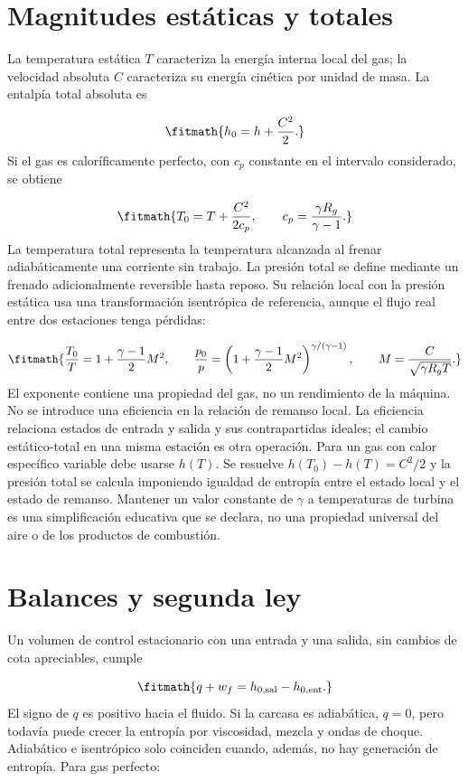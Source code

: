 \documentclass[10pt,openany]{book}
\begin{document}
\section{Magnitudes estáticas y totales}

La temperatura estática \(T\) caracteriza la energía interna local del gas; la velocidad absoluta \(C\) caracteriza su energía cinética por unidad de masa. La entalpía total absoluta es

\[
\fitmath{h_0=h+\frac{C^2}{2}.}
\]
Si el gas es caloríficamente perfecto, con \(c_p\) constante en el intervalo considerado, se obtiene

\[
\fitmath{T_0=T+\frac{C^2}{2c_p},\qquad c_p=\frac{\gamma R_g}{\gamma-1}.}
\]
La temperatura total representa la temperatura alcanzada al frenar adiabáticamente una corriente sin trabajo. La presión total se define mediante un frenado adicionalmente reversible hasta reposo. Su relación local con la presión estática usa una transformación isentrópica de referencia, aunque el flujo real entre dos estaciones tenga pérdidas:

\[
\fitmath{\frac{T_0}{T}=1+\frac{\gamma-1}{2}M^2,\qquad
\frac{p_0}{p}=\left(1+\frac{\gamma-1}{2}M^2\right)^{\gamma/(\gamma-1)},\qquad M=\frac{C}{\sqrt{\gamma R_g T}}.}
\]
El exponente contiene una propiedad del gas, no un rendimiento de la máquina. No se introduce una eficiencia en la relación de remanso local. La eficiencia relaciona estados de entrada y salida y sus contrapartidas ideales; el cambio estático-total en una misma estación es otra operación.
Para un gas con calor específico variable debe usarse \(h(T)\). Se resuelve \(h(T_0)-h(T)=C^2/2\) y la presión total se calcula imponiendo igualdad de entropía entre el estado local y el estado de remanso. Mantener un valor constante de \(\gamma\) a temperaturas de turbina es una simplificación educativa que se declara, no una propiedad universal del aire o de los productos de combustión.

\section{Balances y segunda ley}

Un volumen de control estacionario con una entrada y una salida, sin cambios de cota apreciables, cumple

\[
\fitmath{q+w_f=h_{0,\mathrm{sal}}-h_{0,\mathrm{ent}}.}
\]
El signo de \(q\) es positivo hacia el fluido. Si la carcasa es adiabática, \(q=0\), pero todavía puede crecer la entropía por viscosidad, mezcla y ondas de choque. Adiabático e isentrópico solo coinciden cuando, además, no hay generación de entropía. Para gas perfecto:
\end{document}
